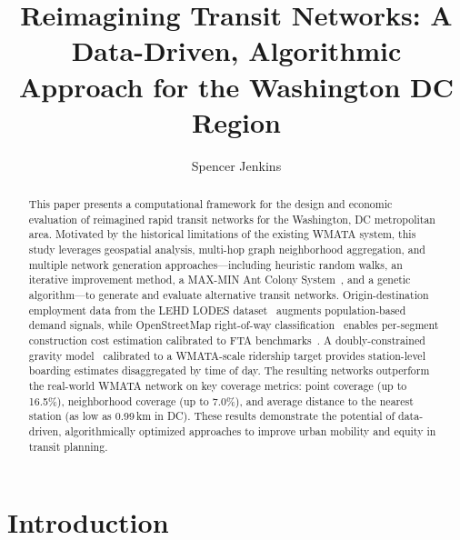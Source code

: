 \documentclass[sigconf,nonacm]{acmart}
\begin{document}
\title{Reimagining Transit Networks: A Data-Driven, Algorithmic Approach for the Washington DC Region}

\author{Spencer Jenkins}

\renewcommand{\shortauthors}{S. Jenkins}

\begin{abstract}
This paper presents a computational framework for the design and economic evaluation of reimagined rapid transit networks for the Washington, DC metropolitan area. Motivated by the historical limitations of the existing WMATA system, this study leverages geospatial analysis, multi-hop graph neighborhood aggregation, and multiple network generation approaches---including heuristic random walks, an iterative improvement method, a MAX-MIN Ant Colony System~\cite{stutzle2000mmas,nikolic2013aco}, and a genetic algorithm---to generate and evaluate alternative transit networks. Origin-destination employment data from the LEHD LODES dataset~\cite{lodes2023} augments population-based demand signals, while OpenStreetMap right-of-way classification~\cite{boeing2017osmnx} enables per-segment construction cost estimation calibrated to FTA benchmarks~\cite{fta2023ntd,flyvbjerg2003overruns}. A doubly-constrained gravity model~\cite{wilson1971gravity} calibrated to a WMATA-scale ridership target provides station-level boarding estimates disaggregated by time of day. The resulting networks outperform the real-world WMATA network on key coverage metrics: point coverage (up to 16.5\%), neighborhood coverage (up to 7.0\%), and average distance to the nearest station (as low as 0.99\,km in DC). These results demonstrate the potential of data-driven, algorithmically optimized approaches to improve urban mobility and equity in transit planning.
\end{abstract}

\maketitle



\section{Introduction}
\end{document}
